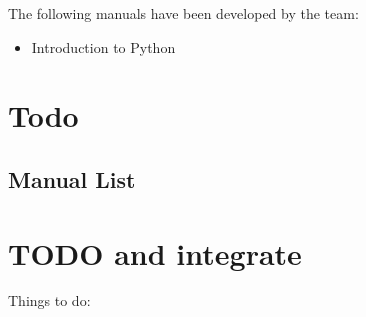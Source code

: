 \documentclass[sigplan,screen]{format/acmart}
\begin{document}
{The following manuals have been developed by the team:

\begin{itemize}
    \item Introduction to Python \cite{las-intro-python}
\end{itemize}

\clearpage 

\section{Todo}

\subsection{Manual List}
\section{TODO and integrate}

Things to do: 

}
\end{document}
